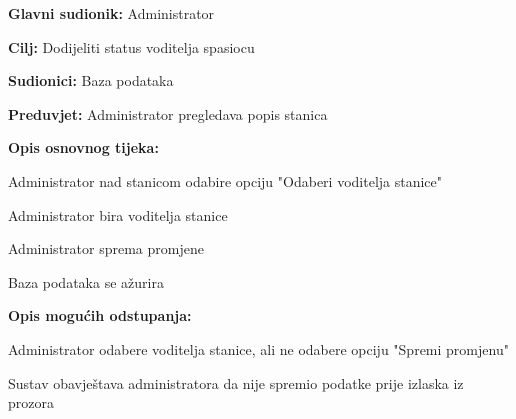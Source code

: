 		\begin{packed_item}
			
			\item \textbf{Glavni sudionik: }Administrator
			\item  \textbf{Cilj:} Dodijeliti status voditelja spasiocu
			\item  \textbf{Sudionici:} Baza podataka
			\item  \textbf{Preduvjet:} Administrator pregledava popis stanica
			\item  \textbf{Opis osnovnog tijeka:}
			
			\item[] \begin{packed_enum}
				
				\item Administrator nad stanicom odabire opciju "Odaberi voditelja stanice"
				\item Administrator bira voditelja stanice
				\item Administrator sprema promjene
				\item Baza podataka se ažurira
			\end{packed_enum}
			
			\item  \textbf{Opis mogućih odstupanja:}
			
			\item[] \begin{packed_item}
				
				\item[2.a] Administrator odabere voditelja stanice, ali ne odabere opciju "Spremi promjenu"
				\item[] \begin{packed_enum}
					
					\item Sustav obavještava administratora da nije spremio podatke prije izlaska iz prozora\\
					
				\end{packed_enum}
			\end{packed_item}
		\end{packed_item}
				
